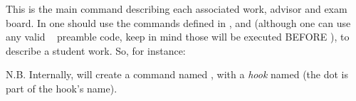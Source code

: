 \documentclass[dctools,english,tocdepth=3,secdepth=3]{ufrgscca} %
\begin{document}
\begin{Macros}{\NewStudent}
	\begin{Syntax}%
	\end{Syntax}
	This is the main command describing each  associated work, advisor and exam board. In  one should use the commands defined in , and  (although one can use  any valid \LaTeXe~ preamble code, keep in mind those will be executed BEFORE \Macro{\begin{document}}{}), to describe a student work.
	So, for instance:
	\begin{stcode}[st=d.newstudent]
\end{stcode}


N.B. Internally, \Macro{\NewStudent}{} will create a command named \Macro{\studentname}{}, with a \emph{hook} named  (the dot is part of the hook's name).
\end{Macros}
\end{document}
